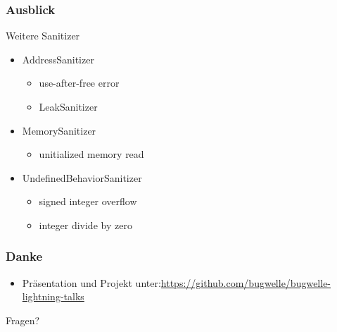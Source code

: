 \documentclass[xcolor=dvipsnames,hyperref={pdfpagelabels=false}]{beamer}
\begin{document}
\begin{frame}
	\frametitle{Ausblick}
	\begin{block}{Weitere Sanitizer}
		\medskip	
		\begin{itemize}
			\item AddressSanitizer
				\begin{itemize}
					\item use-after-free error
					\item LeakSanitizer
				\end{itemize}
				\medskip
			\item MemorySanitizer
				\begin{itemize}
					\item unitialized memory read
				\end{itemize}
				\medskip
			\item UndefinedBehaviorSanitizer
				\begin{itemize}
					\item signed integer overflow
					\item integer divide by zero
				\end{itemize}
			\end{itemize}
		\end{block}	
\end{frame}

\begin{frame}
	\frametitle{Danke}
	\begin{itemize}
		\item Präsentation und Projekt unter:\newline \footnotesize{\url{https://github.com/bugwelle/bugwelle-lightning-talks}}
	\end{itemize}
	\bigskip
	\bigskip
	\begin{center}
		\huge Fragen?
	\end{center}
\end{frame}
\end{document}
